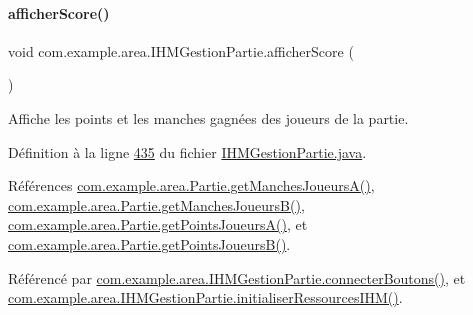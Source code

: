 \paragraph{\texorpdfstring{afficher\+Score()}{afficherScore()}}
{\footnotesize\ttfamily void com.\+example.\+area.\+I\+H\+M\+Gestion\+Partie.\+afficher\+Score (\begin{DoxyParamCaption}{ }\end{DoxyParamCaption})\hspace{0.3cm}{\ttfamily [private]}}



Affiche les points et les manches gagnées des joueurs de la partie. 



Définition à la ligne \hyperlink{_i_h_m_gestion_partie_8java_source_l00435}{435} du fichier \hyperlink{_i_h_m_gestion_partie_8java_source}{I\+H\+M\+Gestion\+Partie.\+java}.



Références \hyperlink{_partie_8java_source_l00096}{com.\+example.\+area.\+Partie.\+get\+Manches\+Joueurs\+A()}, \hyperlink{_partie_8java_source_l00104}{com.\+example.\+area.\+Partie.\+get\+Manches\+Joueurs\+B()}, \hyperlink{_partie_8java_source_l00080}{com.\+example.\+area.\+Partie.\+get\+Points\+Joueurs\+A()}, et \hyperlink{_partie_8java_source_l00088}{com.\+example.\+area.\+Partie.\+get\+Points\+Joueurs\+B()}.



Référencé par \hyperlink{_i_h_m_gestion_partie_8java_source_l00346}{com.\+example.\+area.\+I\+H\+M\+Gestion\+Partie.\+connecter\+Boutons()}, et \hyperlink{_i_h_m_gestion_partie_8java_source_l00223}{com.\+example.\+area.\+I\+H\+M\+Gestion\+Partie.\+initialiser\+Ressources\+I\+H\+M()}.



